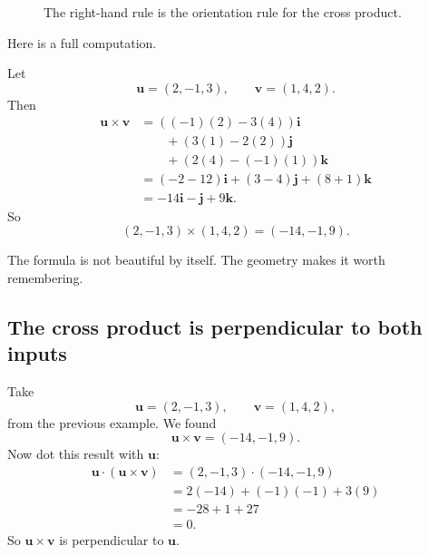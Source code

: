 \begin{figure}[h]
\centering
{}
\caption{The right-hand rule is the orientation rule for the cross product.}
\end{figure}

Here is a full computation.

\begin{example}
Let
\[
    \mathbf u=(2,-1,3),
    \qquad
    \mathbf v=(1,4,2).
\]
Then
\[
\begin{aligned}
\mathbf u\times\mathbf v
&=
((-1)(2)-3(4))\mathbf i\\
&\qquad
+(3(1)-2(2))\mathbf j\\
&\qquad
+(2(4)-(-1)(1))\mathbf k\\
&=
(-2-12)\mathbf i+(3-4)\mathbf j+(8+1)\mathbf k\\
&=
-14\mathbf i-\mathbf j+9\mathbf k.
\end{aligned}
\]
So
\[
    (2,-1,3)\times(1,4,2)=(-14,-1,9).
\]
\end{example}

The formula is not beautiful by itself.  The geometry makes it worth remembering.

\subsection{The cross product is perpendicular to both inputs}

Take
\[
    \mathbf u=(2,-1,3),
    \qquad
    \mathbf v=(1,4,2),
\]
from the previous example.  We found
\[
    \mathbf u\times\mathbf v=(-14,-1,9).
\]
Now dot this result with \(\mathbf u\):
\[
\begin{aligned}
    \mathbf u\cdot(\mathbf u\times\mathbf v)
    &=
    (2,-1,3)\cdot(-14,-1,9)\\
    &=
    2(-14)+(-1)(-1)+3(9)\\
    &=
    -28+1+27\\
    &=0.
\end{aligned}
\]
So \(\mathbf u\times\mathbf v\) is perpendicular to \(\mathbf u\).

